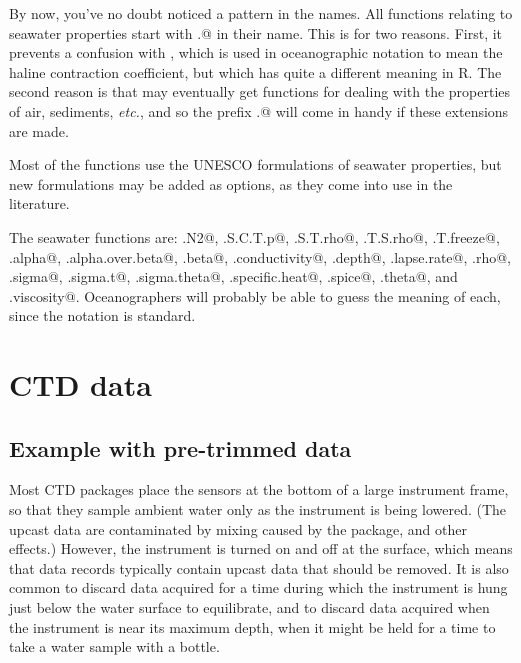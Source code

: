 \documentclass{article}
\begin{document}
By now, you've no doubt noticed a pattern in the names. All functions relating to seawater
properties start with \verb@sw.@ in their name. This is for two reasons. First, it prevents a
confusion with \verb@beta@, which is used in oceanographic notation to mean the haline
contraction coefficient, but which has quite a different meaning in R. The second reason is
that \verb@oce@ may eventually get functions for dealing with the properties of air,
sediments, \emph{etc.}, and so the prefix \verb@sw.@ will come in handy if these extensions
are made.

Most of the functions use the UNESCO formulations of seawater properties, but new formulations
may be added as options, as they come into use in the literature.

The seawater functions are:
\verb@sw.N2@,
\verb@sw.S.C.T.p@,
\verb@sw.S.T.rho@,
\verb@sw.T.S.rho@,
\verb@sw.T.freeze@,
\verb@sw.alpha@,
\verb@sw.alpha.over.beta@,
\verb@sw.beta@,
\verb@sw.conductivity@,
\verb@sw.depth@,
\verb@sw.lapse.rate@,
\verb@sw.rho@,
\verb@sw.sigma@,
\verb@sw.sigma.t@,
\verb@sw.sigma.theta@,
\verb@sw.specific.heat@,
\verb@sw.spice@,
\verb@sw.theta@,
and
\verb@sw.viscosity@.
Oceanographers
will probably be able to guess the meaning of each, since the notation is standard.



\section{CTD data}
\subsection{Example with pre-trimmed data}

Most CTD packages place the sensors at the bottom of a large instrument frame, so that they
sample ambient water only as the instrument is being lowered. (The upcast data are
contaminated by mixing caused by the package, and other effects.) However, the instrument is
turned on and off at the surface, which means that data records typically contain upcast data
that should be removed. It is also common to discard data acquired for a time during which the
instrument is hung just below the water surface to equilibrate, and to discard data acquired
when the instrument is near its maximum depth, when it might be held for a time to take a
water sample with a bottle. 
\end{document}

